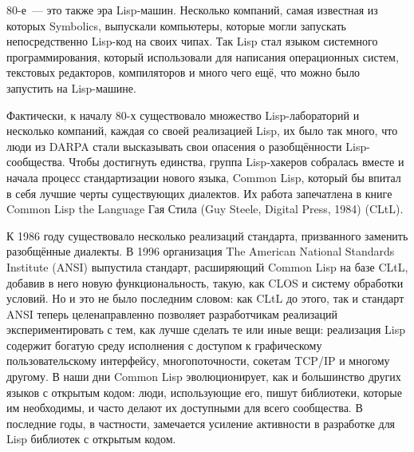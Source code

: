 80-е~--- это также эра Lisp-машин. Несколько компаний, самая известная из которых
Symbolics, выпускали компьютеры, которые могли запускать непосредственно Lisp-код на своих
чипах. Так Lisp стал языком системного программирования, который использовали для
написания операционных систем, текстовых редакторов, компиляторов и много чего ещё, что
можно было запустить на Lisp-машине.

Фактически, к началу 80-х существовало множество Lisp-лабораторий и несколько компаний,
каждая со своей реализацией Lisp, их было так много, что люди из DARPA стали высказывать
свои опасения о разобщённости Lisp-сообщества. Чтобы достигнуть единства, группа
Lisp-хакеров собралась вместе и начала процесс стандартизации нового языка, Common Lisp,
который бы впитал в себя лучшие черты существующих диалектов. Их работа запечатлена в
книге Common Lisp the Language Гая Стила (Guy Steele, Digital Press, 1984) (CLtL).

К 1986 году существовало несколько реализаций стандарта, призванного заменить разобщённые
диалекты. В 1996 организация The American National Standards Institute (ANSI) выпустила
стандарт, расширяющий Common Lisp на базе CLtL, добавив в него новую функциональность,
такую, как CLOS и систему обработки условий. Но и это не было последним словом: как CLtL
до этого, так и стандарт ANSI теперь целенаправленно позволяет разработчикам реализаций
экспериментировать с тем, как лучше сделать те или иные вещи: реализация Lisp содержит
богатую среду исполнения с доступом к графическому пользовательскому интерфейсу,
многопоточности, сокетам TCP/IP и многому другому. В наши дни Common Lisp эволюционирует,
как и большинство других языков с открытым кодом: люди, использующие его, пишут
библиотеки, которые им необходимы, и часто делают их доступными для всего сообщества. В
последние годы, в частности, замечается усиление активности в разработке для Lisp
библиотек с открытым кодом.

